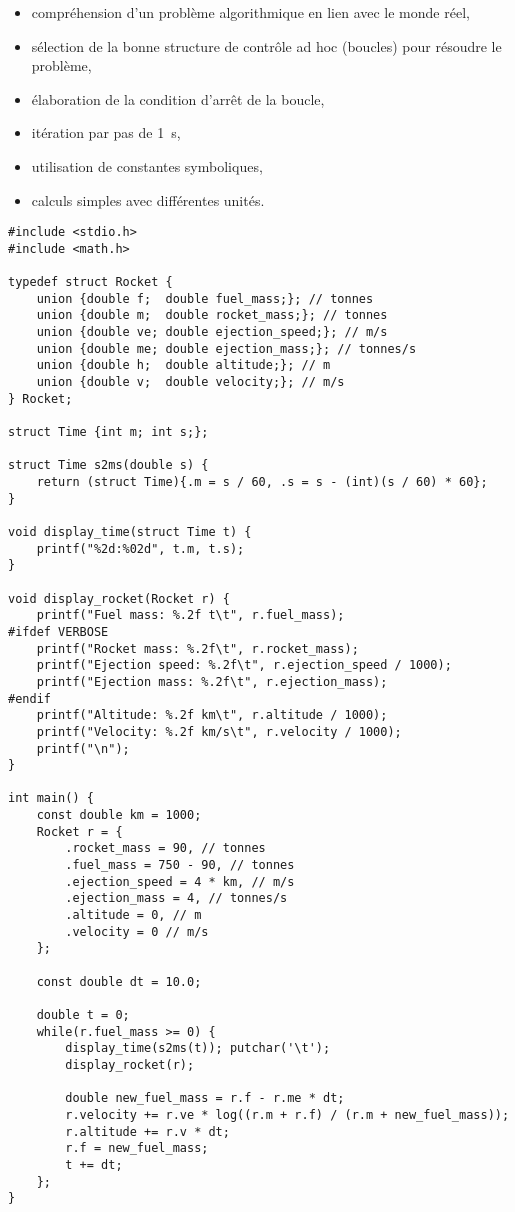 \documentclass[french,a4paper,addpoints,11pt]{exam}
\begin{document}
\begin{questions}
\begin{multicols}{2}
        \begin{itemize}
            \item compréhension d'un problème algorithmique en lien avec le monde réel,
            \item sélection de la bonne structure de contrôle ad hoc (boucles) pour résoudre le problème,
            \item élaboration de la condition d'arrêt de la boucle,
            \item itération par pas de \SI{1}{\second},
            \item utilisation de constantes symboliques,
            \item calculs simples avec différentes unités.
        \end{itemize}
    \end{multicols}
    \begin{solution}
    \begin{lstlisting}
#include <stdio.h>
#include <math.h>

typedef struct Rocket {
    union {double f;  double fuel_mass;}; // tonnes
    union {double m;  double rocket_mass;}; // tonnes
    union {double ve; double ejection_speed;}; // m/s
    union {double me; double ejection_mass;}; // tonnes/s
    union {double h;  double altitude;}; // m
    union {double v;  double velocity;}; // m/s
} Rocket;

struct Time {int m; int s;};

struct Time s2ms(double s) {
    return (struct Time){.m = s / 60, .s = s - (int)(s / 60) * 60};
}

void display_time(struct Time t) {
    printf("%2d:%02d", t.m, t.s);
}

void display_rocket(Rocket r) {
    printf("Fuel mass: %.2f t\t", r.fuel_mass);
#ifdef VERBOSE
    printf("Rocket mass: %.2f\t", r.rocket_mass);
    printf("Ejection speed: %.2f\t", r.ejection_speed / 1000);
    printf("Ejection mass: %.2f\t", r.ejection_mass);
#endif
    printf("Altitude: %.2f km\t", r.altitude / 1000);
    printf("Velocity: %.2f km/s\t", r.velocity / 1000);
    printf("\n");
}

int main() {
    const double km = 1000;
    Rocket r = {
        .rocket_mass = 90, // tonnes
        .fuel_mass = 750 - 90, // tonnes
        .ejection_speed = 4 * km, // m/s
        .ejection_mass = 4, // tonnes/s
        .altitude = 0, // m
        .velocity = 0 // m/s
    };

    const double dt = 10.0;

    double t = 0;
    while(r.fuel_mass >= 0) {
        display_time(s2ms(t)); putchar('\t');
        display_rocket(r);

        double new_fuel_mass = r.f - r.me * dt;
        r.velocity += r.ve * log((r.m + r.f) / (r.m + new_fuel_mass));
        r.altitude += r.v * dt;
        r.f = new_fuel_mass;
        t += dt;
    };
}
    \end{lstlisting}
    \end{solution}
    \end{questions}
\end{document}
